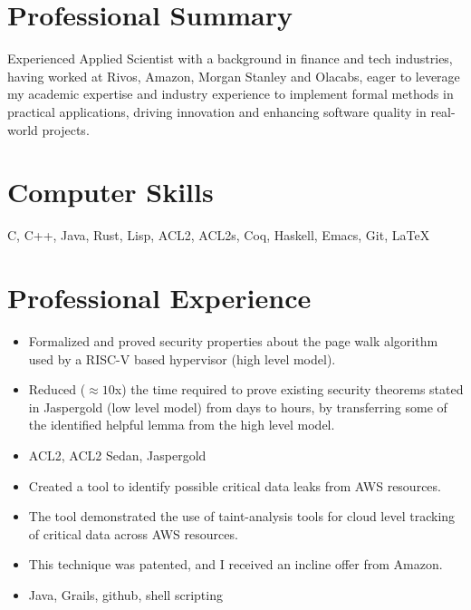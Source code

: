 \documentclass[11pt,a4paper,sans]{moderncv}
\begin{document}
\makecvtitle
\vspace{-1cm}
\section{Professional Summary}
Experienced Applied Scientist with a background in finance and tech
industries, having worked at Rivos, Amazon, Morgan Stanley and
Olacabs, eager to leverage my academic expertise and
industry experience to implement formal methods in practical
applications, driving innovation and enhancing software quality in
real-world projects.

\section{Computer Skills}
C, C++, Java, Rust, Lisp, ACL2, ACL2s, Coq, Haskell, Emacs, Git,
\LaTeX

\section{Professional Experience}
\begin{itemize}
\item Formalized and proved security properties
  about the page walk algorithm used by a RISC-V based hypervisor (high level model).
\item Reduced ($\approx10$x) the time required to prove existing security theorems
  stated in Jaspergold (low level model) from days to hours, by
  transferring some of the identified helpful lemma from the high
  level model.
\item ACL2, ACL2 Sedan, Jaspergold
\end{itemize}
\begin{itemize}
  \item Created a tool to identify possible critical data leaks from
    AWS resources.
  \item The tool demonstrated the use of taint-analysis tools for cloud
    level tracking of critical data across AWS resources.
  \item This technique was patented, and I received an incline offer
    from Amazon. 
  \item Java, Grails, github, shell scripting
\end{itemize}
\end{document}
